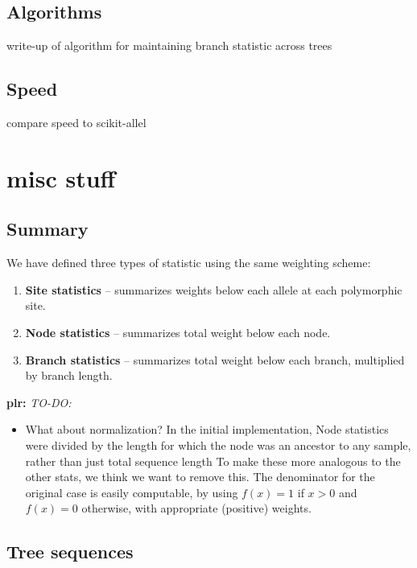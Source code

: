 \documentclass{article}
\newcommand{\plr}[1]{{\color{blue}\textbf{plr:} \it #1}}
\begin{document}
\subsection*{Algorithms}
write-up of algorithm for maintaining branch statistic across trees

\subsection*{Speed}

compare speed to scikit-allel


\section{misc stuff}


\subsection*{Summary}
We have defined three types of statistic using the same weighting scheme:
\begin{enumerate}
    \item \textbf{Site statistics}
        -- summarizes weights below each allele at each polymorphic site.
    \item \textbf{Node statistics}
        -- summarizes total weight below each node.
    \item \textbf{Branch statistics}
        -- summarizes total weight below each branch, multiplied by branch length.
\end{enumerate}


\plr{TO-DO:}
\begin{itemize}

    \item What about normalization?
        In the initial implementation, Node statistics were divided by the length
        for which the node was an ancestor to any sample, rather than just total sequence length
        To make these more analogous to the other stats, we think we want to remove this.
        The denominator for the original case is easily computable, by using
        $f(x) = 1$ if $x>0$ and $f(x)=0$ otherwise, with appropriate (positive) weights.

\end{itemize}


\subsection*{Tree sequences}
\end{document}
